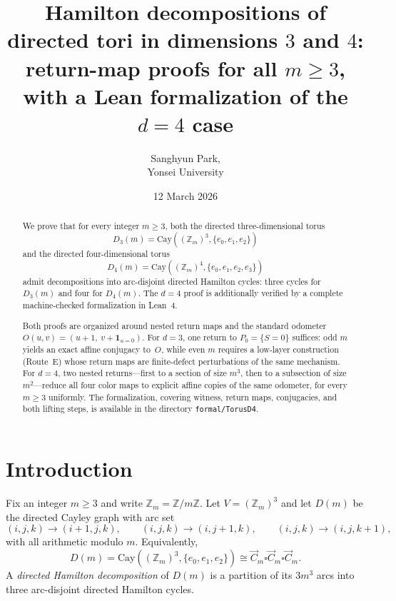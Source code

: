 \documentclass[11pt]{article}
\title{Hamilton decompositions of directed tori in dimensions $3$ and $4$:\\
return-map proofs for all $m\ge 3$, with a Lean formalization of the $d=4$ case}
\author{Sanghyun Park, \\ Yonsei University}
\date{12 March 2026}
\newcommand{\I}{\mathbf 1}
\begin{document}
\maketitle

\begin{abstract}
We prove that for every integer $m\ge 3$, both the directed three-dimensional torus
\[
D_3(m)=\mathrm{Cay}((\mathbb Z_m)^3,\{e_0,e_1,e_2\})
\]
and the directed four-dimensional torus
\[
D_4(m)=\mathrm{Cay}((\mathbb Z_m)^4,\{e_0,e_1,e_2,e_3\})
\]
admit decompositions into arc-disjoint directed Hamilton cycles: three cycles for $D_3(m)$ and four for $D_4(m)$.
The $d=4$ proof is additionally verified by a complete machine-checked formalization in Lean~4.

Both proofs are organized around nested return maps and the standard odometer
$O(u,v)=(u+1,\ v+\I_{u=0})$.
For $d=3$, one return to $P_0=\{S=0\}$ suffices: odd $m$ yields an exact affine conjugacy to~$O$, while even $m$ requires a low-layer construction (Route~E) whose return maps are finite-defect perturbations of the same mechanism.
For $d=4$, two nested returns---first to a section of size $m^3$, then to a subsection of size $m^2$---reduce all four color maps to explicit affine copies of the same odometer, for every $m\ge 3$ uniformly.
The formalization, covering witness, return maps, conjugacies, and both lifting steps, is available in the directory \texttt{formal/TorusD4}.
\end{abstract}


\section{Introduction}

Fix an integer $m\ge 3$ and write $\mathbb Z_m=\mathbb Z/m\mathbb Z$.
Let $V=(\mathbb Z_m)^3$ and let $D(m)$ be the directed Cayley graph with arc set
\[
(i,j,k)\to(i+1,j,k),\qquad (i,j,k)\to(i,j+1,k),\qquad (i,j,k)\to(i,j,k+1),
\]
with all arithmetic modulo $m$.
Equivalently,
\[
D(m)=\mathrm{Cay}((\mathbb Z_m)^3,\{e_0,e_1,e_2\})\cong \vec C_m\square \vec C_m\square \vec C_m.
\]
A \emph{directed Hamilton decomposition} of $D(m)$ is a partition of its $3m^3$ arcs into three arc-disjoint directed Hamilton cycles.
\end{document}
